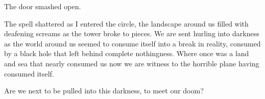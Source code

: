 The door smashed open.

The spell shattered as I entered the circle, the landscape around us filled with deafening screams as the tower broke to pieces. We are sent hurling into darkness as the world around us seemed to consume itself into a break in reality, consumed by a black hole that left behind complete nothingness. Where once was a land and sea that nearly consumed us now we are witness to the horrible plane having consumed itself.

Are we next to be pulled into this darkness, to meet our doom?

